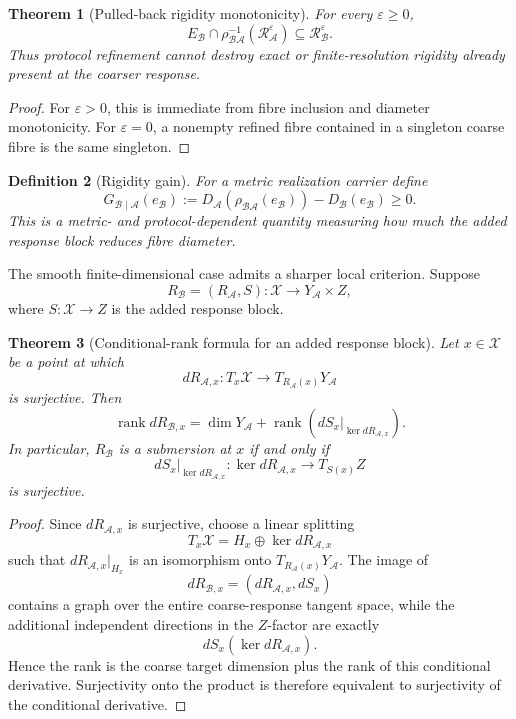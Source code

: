 \documentclass[11pt]{article}
\newtheorem{definition}{Definition}[section]
\newtheorem{theorem}[definition]{Theorem}
\newcommand{\X}{\mathcal X}
\newcommand{\Acal}{\mathcal A}
\newcommand{\Bcal}{\mathcal B}
\begin{document}
\begin{theorem}[Pulled-back rigidity monotonicity]
\label{thm:rigidity-pullback}
For every \(\varepsilon\ge0\),
\[
E_{\Bcal}\cap
\rho_{\Bcal\Acal}^{-1}
(\mathcal R_{\Acal}^{\varepsilon})
\subseteq
\mathcal R_{\Bcal}^{\varepsilon}.
\]
Thus protocol refinement cannot destroy exact or finite-resolution rigidity
already present at the coarser response.
\end{theorem}

\begin{proof}
For \(\varepsilon>0\), this is immediate from fibre inclusion and diameter
monotonicity. For \(\varepsilon=0\), a nonempty refined fibre contained in
a singleton coarse fibre is the same singleton.
\end{proof}

\begin{definition}[Rigidity gain]
For a metric realization carrier define
\[
G_{\Bcal\mid\Acal}(e_{\Bcal})
:=
D_{\Acal}(\rho_{\Bcal\Acal}(e_{\Bcal}))
-D_{\Bcal}(e_{\Bcal})
\ge0.
\]
This is a metric- and protocol-dependent quantity measuring how much the
added response block reduces fibre diameter.
\end{definition}

The smooth finite-dimensional case admits a sharper local criterion. Suppose
\[
R_{\Bcal}=(R_{\Acal},S):\X\to Y_{\Acal}\times Z,
\]
where \(S:\X\to Z\) is the added response block.

\begin{theorem}[Conditional-rank formula for an added response block]
\label{thm:conditional-rank}
Let \(x\in\X\) be a point at which
\[
dR_{\Acal,x}:T_x\X\to T_{R_{\Acal}(x)}Y_{\Acal}
\]
is surjective. Then
\[
\operatorname{rank}dR_{\Bcal,x}
=
\dim Y_{\Acal}
+
\operatorname{rank}
\left(
dS_x\big|_{\ker dR_{\Acal,x}}
\right).
\]
In particular, \(R_{\Bcal}\) is a submersion at \(x\) if and only if
\[
dS_x\big|_{\ker dR_{\Acal,x}}:
\ker dR_{\Acal,x}\to T_{S(x)}Z
\]
is surjective.
\end{theorem}

\begin{proof}
Since \(dR_{\Acal,x}\) is surjective, choose a linear splitting
\[
T_x\X=H_x\oplus\ker dR_{\Acal,x}
\]
such that \(dR_{\Acal,x}|_{H_x}\) is an isomorphism onto
\(T_{R_{\Acal}(x)}Y_{\Acal}\). The image of
\[
dR_{\Bcal,x}=(dR_{\Acal,x},dS_x)
\]
contains a graph over the entire coarse-response tangent space, while the
additional independent directions in the \(Z\)-factor are exactly
\[
dS_x(\ker dR_{\Acal,x}).
\]
Hence the rank is the coarse target dimension plus the rank of this
conditional derivative. Surjectivity onto the product is therefore
equivalent to surjectivity of the conditional derivative.
\end{proof}
\end{document}
